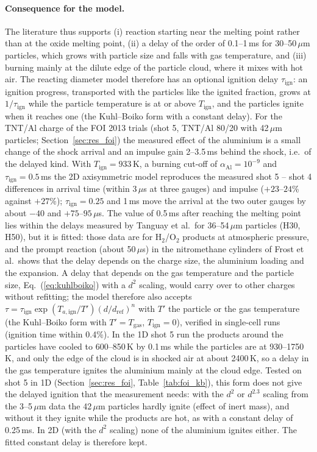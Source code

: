 \documentclass{article}
\begin{document}
\paragraph{Consequence for the model.} The literature thus supports (i) reaction starting near the melting point rather than at the oxide melting point, (ii) a delay of the order of 0.1--1\,ms for 30--50\,$\mu$m particles, which grows with particle size and falls with gas temperature, and (iii) burning mainly at the dilute edge of the particle cloud, where it mixes with hot air. The reacting diameter model therefore has an optional ignition delay $\tau_\text{ign}$: an ignition progress, transported with the particles like the ignited fraction, grows at $1/\tau_\text{ign}$ while the particle temperature is at or above $T_\text{ign}$, and the particles ignite when it reaches one (the Kuhl--Boiko form with a constant delay). For the TNT/Al charge of the FOI 2013 trials (shot 5, TNT/Al 80/20 with 42\,$\mu$m particles; Section~\ref{sec:res_foi}) the measured effect of the aluminium is a small change of the shock arrival and an impulse gain 2--3.5\,ms behind the shock, i.e.\ of the delayed kind. With $T_\text{ign} = 933$\,K, a burning cut-off of $\alpha_\text{Al} = 10^{-9}$ and $\tau_\text{ign} = 0.5$\,ms the 2D axisymmetric model reproduces the measured shot 5 -- shot 4 differences in arrival time (within 3\,$\mu$s at three gauges) and impulse ($+23$--$24$\% against $+27$\%); $\tau_\text{ign} = 0.25$ and 1\,ms move the arrival at the two outer gauges by about $-40$ and $+75$--$95$\,$\mu$s. The value of 0.5\,ms after reaching the melting point lies within the delays measured by Tanguay et al.\ for 36--54\,$\mu$m particles (H30, H50), but it is fitted: those data are for H$_2$/O$_2$ products at atmospheric pressure, and the prompt reaction (about 50\,$\mu$s) in the nitromethane cylinders of Frost et al.\ shows that the delay depends on the charge size, the aluminium loading and the expansion. A delay that depends on the gas temperature and the particle size, Eq.~(\ref{eq:kuhlboiko}) with a $d^2$ scaling, would carry over to other charges without refitting; the model therefore also accepts $\tau = \tau_\text{ign}\exp(T_{a,\text{ign}}/T')(d/d_\text{ref})^{n}$ with $T'$ the particle or the gas temperature (the Kuhl--Boiko form with $T' = T_\text{gas}$, $T_\text{ign} = 0$), verified in single-cell runs (ignition time within 0.4\%). In the 1D shot 5 run the products around the particles have cooled to 600--850\,K by 0.1\,ms while the particles are at 930--1750\,K, and only the edge of the cloud is in shocked air at about 2400\,K, so a delay in the gas temperature ignites the aluminium mainly at the cloud edge. Tested on shot 5 in 1D (Section~\ref{sec:res_foi}, Table~\ref{tab:foi_kb}), this form does not give the delayed ignition that the measurement needs: with the $d^2$ or $d^{2.3}$ scaling from the 3--5\,$\mu$m data the 42\,$\mu$m particles hardly ignite (effect of inert mass), and without it they ignite while the products are hot, as with a constant delay of 0.25\,ms. In 2D (with the $d^2$ scaling) none of the aluminium ignites either. The fitted constant delay is therefore kept.
\end{document}
